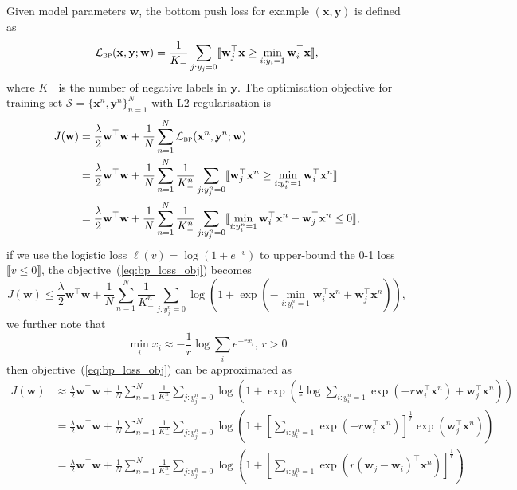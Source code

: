\documentclass[9pt]{extarticle}
\newcommand{\llb}{\llbracket}
\newcommand{\rrb}{\rrbracket}
\newcommand{\x}{\mathbf{x}}
\newcommand{\y}{\mathbf{y}}
\newcommand{\1}{\mathbf{1}}
\newcommand{\w}{\mathbf{w}}
\newcommand{\LCal}{\mathcal{L}}
\newcommand{\SCal}{\mathcal{S}}
\begin{document}
Given model parameters $\w$, the bottom push loss for example $(\x, \y)$ is defined as
\begin{equation}
\label{eq:bpush_loss}
\LCal_\textsc{bp}(\x, \y; \w) = \frac{1}{K_-} \sum_{j:y_j=0} \llb \w_j^\top \x \ge \min_{i:y_i=1} \w_i^\top \x \rrb,
\end{equation}
where $K_-$ is the number of negative labels in $\y$.
The optimisation objective for training set $\SCal = \{\x^n, \y^n\}_{n=1}^N$ with L2 regularisation is
\begin{equation}
\label{eq:bp_loss_obj}
\begin{aligned}
J(\w) 
&= \frac{\lambda}{2} \w^\top \w + \frac{1}{N} \sum_{n=1}^N \LCal_\textsc{bp}(\x^n, \y^n; \w) \\
&= \frac{\lambda}{2} \w^\top \w + \frac{1}{N} \sum_{n=1}^N
   \frac{1}{K_-^n} \sum_{j:y_j^n=0} \llb \w_j^\top \x^n \ge \min_{i:y_i^n=1} \w_i^\top \x^n \rrb \\
&= \frac{\lambda}{2} \w^\top \w + \frac{1}{N} \sum_{n=1}^N
   \frac{1}{K_-^n} \sum_{j:y_j^n=0} \llb \min_{i:y_i^n=1} \w_i^\top \x^n - \w_j^\top \x^n \le 0\rrb,
\end{aligned}
\end{equation}
if we use the logistic loss $\ell(v) = \log(1 + e^{-v})$ to upper-bound the 0-1 loss $\llb v \le 0 \rrb$, 
the objective~(\ref{eq:bp_loss_obj}) becomes
$$
J(\w) 
\le \frac{\lambda}{2} \w^\top \w + \frac{1}{N} \sum_{n=1}^N
    \frac{1}{K_-^n} \sum_{j:y_j^n=0} \log \left( 1 + 
    \exp \left( -\min_{i:y_i^n=1} \w_i^\top \x^n + \w_j^\top \x^n \right) \right),
$$
we further note that 
$$
\min_i x_i \approx -\frac{1}{r} \log \sum_i e^{-r x_i}, \, r > 0
$$
then objective~(\ref{eq:bp_loss_obj}) can be approximated as
\begin{align*}
J(\w) 
&\approx \frac{\lambda}{2} \w^\top \w + \frac{1}{N} \sum_{n=1}^N
         \frac{1}{K_-^n} \sum_{j:y_j^n=0} \log \left( 1 + 
         \exp \left( \frac{1}{r} \log \sum_{i:y_i^n=1} \exp \left( -r \w_i^\top \x^n \right) + 
         \w_j^\top \x^n \right) \right) \\
&= \frac{\lambda}{2} \w^\top \w + \frac{1}{N} \sum_{n=1}^N
   \frac{1}{K_-^n} \sum_{j:y_j^n=0} \log \left( 1 + 
   \left[ \sum_{i:y_i^n=1} \exp \left( -r \w_i^\top \x^n \right) \right]^\frac{1}{r} \exp \left( \w_j^\top \x^n \right) 
   \right) \\
&= \frac{\lambda}{2} \w^\top \w + \frac{1}{N} \sum_{n=1}^N
   \frac{1}{K_-^n} \sum_{j:y_j^n=0} \log \left( 1 + 
   \left[ \sum_{i:y_i^n=1} \exp \left( r (\w_j - \w_i)^\top \x^n \right) \right]^\frac{1}{r} 
   \right) \\
\end{align*}
\end{document}

